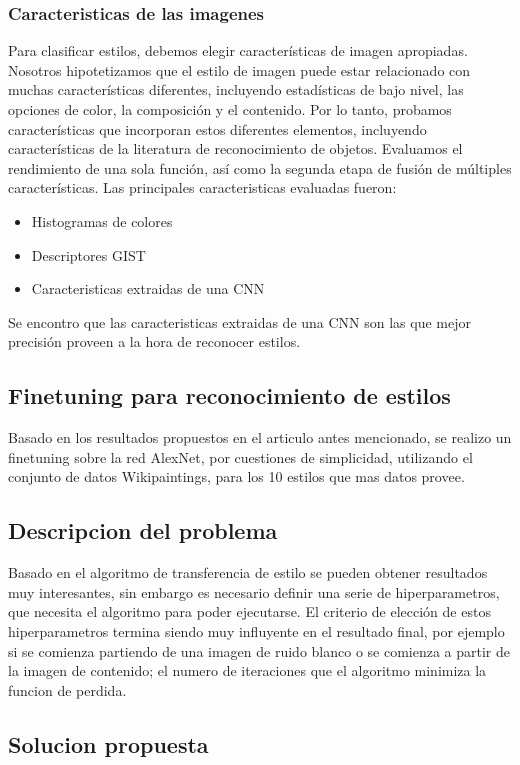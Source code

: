 \documentclass[a4paper,10pt]{article}
\begin{document}
    \subsubsection{Caracteristicas de las imagenes}
	Para clasificar estilos, debemos elegir características de imagen apropiadas. Nosotros hipotetizamos que el estilo de imagen puede estar relacionado con muchas características diferentes, 
	incluyendo estadísticas de bajo nivel, las opciones de color, la composición y el contenido. Por lo tanto, probamos características que incorporan estos diferentes elementos, incluyendo características de la 
	literatura de reconocimiento de objetos. Evaluamos el rendimiento de una sola función, así como la segunda etapa de fusión de múltiples características.
	Las principales caracteristicas evaluadas fueron:
	\begin{itemize}
	 \item Histogramas de colores
	 \item Descriptores GIST
	 \item Caracteristicas extraidas de una CNN
	\end{itemize}
	Se encontro que las caracteristicas extraidas de una CNN son las que mejor precisión proveen a la hora de reconocer estilos.

  \subsection{Finetuning para reconocimiento de estilos}
    Basado en los resultados propuestos en el articulo antes mencionado, se realizo un finetuning sobre la red AlexNet, por cuestiones de simplicidad, utilizando
    el conjunto de datos Wikipaintings, para los 10 estilos que mas datos provee.

    
  \subsection{Descripcion del problema}
    Basado en el algoritmo de transferencia de estilo se pueden obtener resultados muy interesantes, sin embargo es necesario definir una serie de hiperparametros,
    que necesita el algoritmo para poder ejecutarse. El criterio de elección de estos hiperparametros termina siendo muy influyente en el resultado final, por ejemplo
    si se comienza partiendo de una imagen de ruido blanco o se comienza a partir de la imagen de contenido; el numero de iteraciones que el algoritmo minimiza la funcion
    de perdida.
  \subsection{Solucion propuesta}
\end{document}
